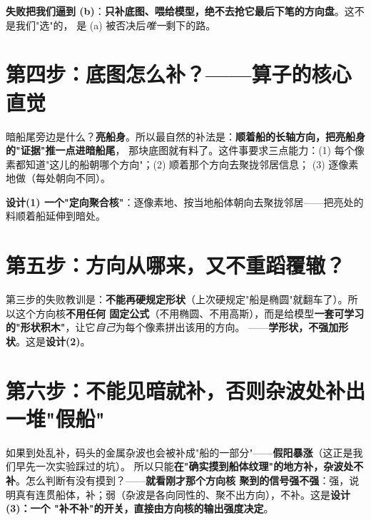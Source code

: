 \documentclass[UTF8,11pt,a4paper]{ctexart}
\begin{document}
\noindent\textbf{失败把我们逼到 (b)}：\textbf{只补底图、喂给模型，绝不去抢它最后下笔的方向盘}。这不是我们"选"的，
是 (a) 被否决后\emph{唯一}剩下的路。

\section{第四步：底图怎么补？——算子的核心直觉}
暗船尾旁边是什么？\textbf{亮船身}。所以最自然的补法是：\textbf{顺着船的长轴方向，把亮船身的"证据"推一点进暗船尾}，
那块底图就有料了。这件事要求三点能力：(1) 每个像素都知道"这儿的船朝哪个方向"；(2) 顺着那个方向去聚拢邻居信息；
(3) 逐像素地做（每处朝向不同）。

\begin{center}
\end{center}

 \textbf{设计(1) 一个"定向聚合核"}：逐像素地、按当地船体朝向去聚拢邻居——把亮处的料顺着船延伸到暗处。

\section{第五步：方向从哪来，又不重蹈覆辙？}
第三步的失败教训是：\textbf{不能再硬规定形状}（上次硬规定"船是椭圆"就翻车了）。所以这个方向核\textbf{不用任何
固定公式}（不用椭圆、不用高斯），而是给模型\textbf{一套可学习的"形状积木"}，让它\emph{自己}为每个像素拼出该用的方向。
——\textbf{学形状，不强加形状}。这是\textbf{设计(2)}。

\section{第六步：不能见暗就补，否则杂波处补出一堆"假船"}
如果到处乱补，码头的金属杂波也会被补成"船的一部分"——\textbf{假阳暴涨}（这正是我们早先一次实验踩过的坑）。
所以只能\textbf{在"确实摸到船体纹理"的地方补，杂波处不补}。怎么判断有没有摸到？——\textbf{就看刚才那个方向核
聚到的信号强不强}：强，说明真有连贯船体，补；弱（杂波是各向同性的、聚不出方向），不补。这是\textbf{设计(3)：一个
"补不补"的开关，直接由方向核的输出强度决定}。
\end{document}
